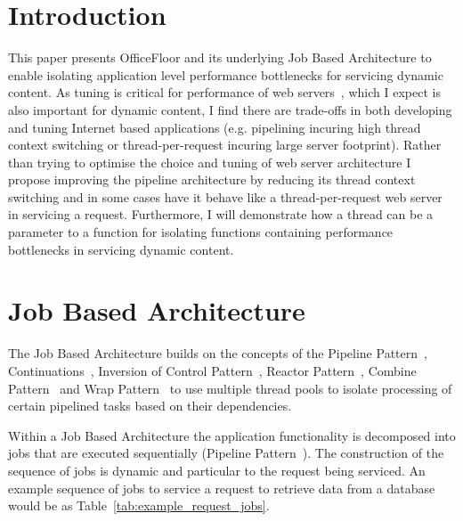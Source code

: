 \documentclass[conference]{ieee/IEEEtran}
\begin{document}
%
\IEEEpeerreviewmaketitle



\section{Introduction}
This paper presents OfficeFloor and its underlying Job Based Architecture to
enable isolating application level performance bottlenecks for servicing dynamic
content. As tuning is critical for performance of web
servers~\cite{tuning-important,tuning-os-important}, which I expect is also
important for dynamic content, I find there are trade-offs in both developing
and tuning Internet based applications (e.g. pipelining incuring high thread
context switching or thread-per-request incuring large server footprint).
Rather than trying to optimise the choice and tuning of web server architecture
I propose improving the pipeline architecture by reducing its thread context
switching and in some cases have it behave like a thread-per-request web server
in servicing a request.  Furthermore, I will demonstrate how a thread can be a
parameter to a function for isolating functions containing performance
bottlenecks in servicing dynamic content.


\section{Job Based Architecture}
The Job Based Architecture builds on the concepts of the Pipeline
Pattern~\cite{pipeline}, Continuations~\cite{continuations}, Inversion of
Control Pattern~\cite{ioc}, Reactor Pattern~\cite{reactor}, Combine
Pattern~\cite{pipeline} and Wrap Pattern~\cite{pipeline} to use multiple thread
pools to isolate processing of certain pipelined tasks based on their
dependencies.

Within a Job Based Architecture the application functionality is decomposed into
jobs that are executed sequentially (Pipeline Pattern~\cite{pipeline}).  The
construction of the sequence of jobs is dynamic and particular to the request
being serviced.  An example sequence of jobs to service a request to retrieve
data from a database would be as Table~\ref{tab:example_request_jobs}.
\end{document}
